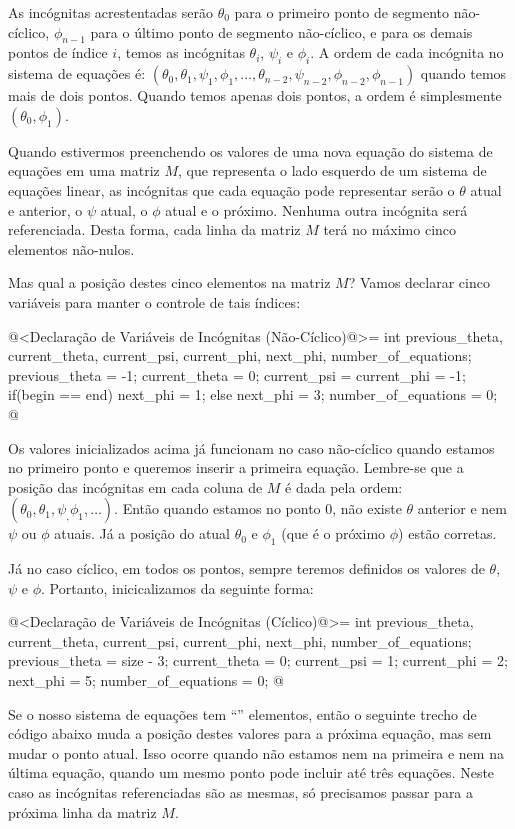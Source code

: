 As incógnitas acrestentadas serão $\theta_0$ para o primeiro ponto de
segmento não-cíclico, $\phi_{n-1}$ para o último ponto de segmento
não-cíclico, e para os demais pontos de índice $i$, temos as
incógnitas $\theta_i$, $\psi_i$ e $\phi_i$. A ordem de cada incógnita
no sistema de equações é:
$(\theta_0, \theta_1, \psi_1, \phi_1, \ldots, \theta_{n-2}, \psi_{n-2}, \phi_{n-2}, \phi_{n-1})$
quando temos mais de dois pontos. Quando temos apenas dois pontos, a
ordem é simplesmente $(\theta_0, \phi_1)$.

Quando estivermos preenchendo os valores de uma nova equação do
sistema de equações em uma matriz $M$, que representa o lado esquerdo
de um sistema de equações linear, as incógnitas que cada equação pode
representar serão o $\theta$ atual e anterior, o $\psi$ atual, o
$\phi$ atual e o próximo. Nenhuma outra incógnita será
referenciada. Desta forma, cada linha da matriz $M$ terá no máximo
cinco elementos não-nulos.

Mas qual a posição destes cinco elementos na matriz $M$? Vamos declarar
cinco variáveis para manter o controle de tais índices:

\iniciocodigo
@<Declaração de Variáveis de Incógnitas (Não-Cíclico)@>=
int previous_theta, current_theta, current_psi, current_phi, next_phi,
    number_of_equations;
previous_theta = -1;
current_theta = 0;
current_psi = current_phi = -1;
if(begin == end)
  next_phi = 1;
else
  next_phi = 3;
number_of_equations = 0;
@
\fimcodigo

Os valores inicializados acima já funcionam no caso não-cíclico quando
estamos no primeiro ponto e queremos inserir a primeira
equação. Lembre-se que a posição das incógnitas em cada coluna de $M$
é dada pela ordem:
$(\theta_0, \theta_1, \psi_, \phi_1, \ldots)$. Então quando estamos no
ponto 0, não existe $\theta$ anterior e nem $\psi$ ou $\phi$
atuais. Já a posição do atual $\theta_0$ e $\phi_1$ (que é o próximo
$\phi$) estão corretas.

Já no caso cíclico, em todos os pontos, sempre teremos definidos os
valores de $\theta$, $\psi$ e $\phi$. Portanto, inicicalizamos da
seguinte forma:

\iniciocodigo
@<Declaração de Variáveis de Incógnitas (Cíclico)@>=
int previous_theta, current_theta, current_psi, current_phi, next_phi,
    number_of_equations;
previous_theta = size - 3;
current_theta = 0;
current_psi = 1;
current_phi = 2;
next_phi = 5;
number_of_equations = 0;
@
\fimcodigo


Se o nosso sistema de equações tem ``'' elementos,
então o seguinte trecho de código abaixo muda a posição destes valores
para a próxima equação, mas sem mudar o ponto atual. Isso ocorre
quando não estamos nem na primeira e nem na última equação, quando um
mesmo ponto pode incluir até três equações. Neste caso as incógnitas
referenciadas são as mesmas, só precisamos passar para a próxima linha
da matriz $M$.

